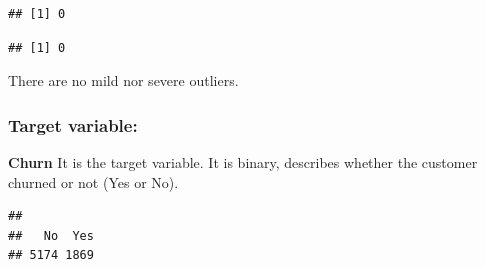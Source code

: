 \documentclass[
  twoside]{article}
\newenvironment{Shaded}{\begin{snugshade}}{\end{snugshade}}
\newcommand{\CommentTok}[1]{\textcolor[rgb]{0.56,0.35,0.01}{\textit{#1}}}
\newcommand{\DecValTok}[1]{\textcolor[rgb]{0.00,0.00,0.81}{#1}}
\newcommand{\FunctionTok}[1]{\textcolor[rgb]{0.13,0.29,0.53}{\textbf{#1}}}
\newcommand{\NormalTok}[1]{#1}
\newcommand{\OtherTok}[1]{\textcolor[rgb]{0.56,0.35,0.01}{#1}}
\newcommand{\SpecialCharTok}[1]{\textcolor[rgb]{0.81,0.36,0.00}{\textbf{#1}}}
\newcommand{\StringTok}[1]{\textcolor[rgb]{0.31,0.60,0.02}{#1}}
\begin{document}
\begin{verbatim}
## [1] 0
\end{verbatim}

\begin{Shaded}
\end{Shaded}

\begin{verbatim}
## [1] 0
\end{verbatim}

There are no mild nor severe outliers.

\hypertarget{target-variable}{%
\subsubsection{Target variable:}\label{target-variable}}

\textbf{Churn} It is the target variable. It is binary, describes
whether the customer churned or not (Yes or No).

\begin{Shaded}
\end{Shaded}

\begin{verbatim}
## 
##   No  Yes 
## 5174 1869
\end{verbatim}

\begin{Shaded}
\end{Shaded}
\end{document}
